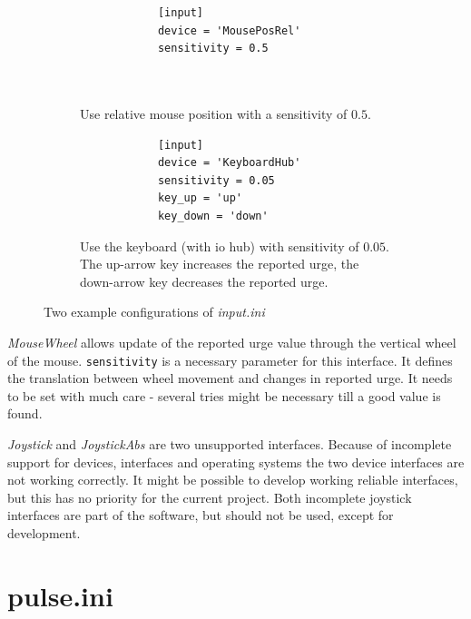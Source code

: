 \documentclass[12pt,a4paper]{book}
\begin{document}
\begin{figure}
	\centering
	\begin{subfigure}[t]{0.4\linewidth}
		\begin{framed}
			\begin{verbatim}
			[input]
			device = 'MousePosRel'
			sensitivity = 0.5
			
			
			\end{verbatim}
		\end{framed}
		\caption{Use relative mouse position with a sensitivity of $0.5$.}
		\label{fig:inputinimouse}
	\end{subfigure}
	\quad
	\begin{subfigure}[t]{0.4\linewidth}
		\begin{framed}%
			\begin{verbatim}
			[input]
			device = 'KeyboardHub'
			sensitivity = 0.05
			key_up = 'up'
			key_down = 'down'
			\end{verbatim}
		\end{framed}
		\caption{Use the keyboard (with io hub) with sensitivity of $0.05$. The up-arrow key increases the reported urge, the down-arrow key decreases the reported urge.}
		\label{fig:inputinikeyboard}
	\end{subfigure}
	
	\caption{Two example configurations of \textit{input.ini}}
	
\end{figure}

\textit{MouseWheel} allows update of the reported urge value through the vertical wheel of the mouse. \verb|sensitivity| is a necessary parameter for this interface. It defines the translation between wheel movement and changes in reported urge. It needs to be set with much care - several tries might be necessary till a good value is found.

\textit{Joystick} and \textit{JoystickAbs} are two unsupported interfaces. Because of incomplete support for devices, interfaces and operating systems the two device interfaces are not working correctly. It might be possible to develop working reliable interfaces, but this has no priority for the current project. Both incomplete joystick interfaces are part of the software, but should not be used, except for development.

\section{pulse.ini}
\end{document}
